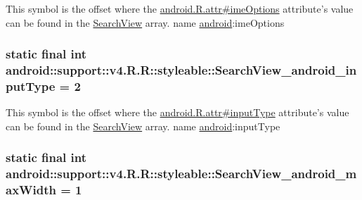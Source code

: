 This symbol is the offset where the \hyperlink{}{android.R.attr\#imeOptions} attribute's value can be found in the \hyperlink{classandroid_1_1support_1_1v4_1_1_r_1_1styleable_63a589da97c59fb7eebd9759edb31f0d}{SearchView} array.  name \hyperlink{namespaceandroid}{android}:imeOptions \hypertarget{classandroid_1_1support_1_1v4_1_1_r_1_1styleable_b8d1739250c6edeea1c7639b77701e8a}{
\subsubsection[{SearchView\_\-android\_\-inputType}]{\setlength{\rightskip}{0pt plus 5cm}static final int android::support::v4.R.R::styleable::SearchView\_\-android\_\-inputType = 2}}
\label{classandroid_1_1support_1_1v4_1_1_r_1_1styleable_b8d1739250c6edeea1c7639b77701e8a}


This symbol is the offset where the \hyperlink{}{android.R.attr\#inputType} attribute's value can be found in the \hyperlink{classandroid_1_1support_1_1v4_1_1_r_1_1styleable_63a589da97c59fb7eebd9759edb31f0d}{SearchView} array.  name \hyperlink{namespaceandroid}{android}:inputType \hypertarget{classandroid_1_1support_1_1v4_1_1_r_1_1styleable_a7408a4cb904af448f8138e31449f9aa}{
\subsubsection[{SearchView\_\-android\_\-maxWidth}]{\setlength{\rightskip}{0pt plus 5cm}static final int android::support::v4.R.R::styleable::SearchView\_\-android\_\-maxWidth = 1}}
\label{classandroid_1_1support_1_1v4_1_1_r_1_1styleable_a7408a4cb904af448f8138e31449f9aa}


